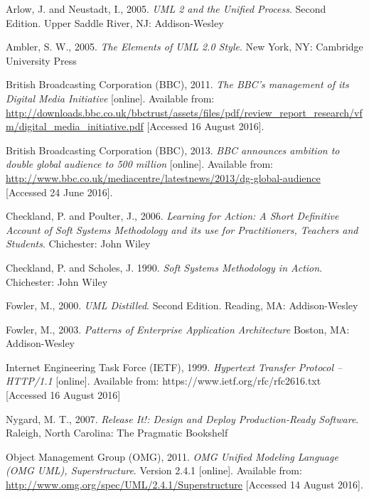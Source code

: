 \documentclass[a4paper]{article}
\begin{document}
\clearpage

\begin{thebibliography}{9}

Arlow, J. and Neustadt, I., 2005.
\textit{UML 2 and the Unified Process}. Second Edition.
Upper Saddle River, NJ: Addison-Wesley

Ambler, S. W., 2005.
\textit{The Elements of UML 2.0 Style}.
New York, NY: Cambridge University Press

British Broadcasting Corporation (BBC), 2011.
\textit{The BBC's management of its Digital Media Initiative} [online].
Available from: \url{http://downloads.bbc.co.uk/bbctrust/assets/files/pdf/review_report_research/vfm/digital_media_initiative.pdf} [Accessed 16 August 2016].

British Broadcasting Corporation (BBC), 2013.
\textit{BBC announces ambition to double global audience to 500 million} [online].
Available from: \url{http://www.bbc.co.uk/mediacentre/latestnews/2013/dg-global-audience} [Accessed 24 June 2016].

Checkland, P. and Poulter, J., 2006.
\textit{Learning for Action: A Short Definitive Account of Soft Systems Methodology and its use for Practitioners, Teachers and Students}.
Chichester: John Wiley

Checkland, P. and Scholes, J. 1990.
\textit{Soft Systems Methodology in Action}.
Chichester: John Wiley

Fowler, M., 2000.
\textit{UML Distilled}. Second Edition.
Reading, MA: Addison-Wesley

Fowler, M., 2003.
\textit{Patterns of Enterprise Application Architecture}
Boston, MA: Addison-Wesley

Internet Engineering Task Force (IETF), 1999.
\textit{Hypertext Transfer Protocol -- HTTP/1.1} [online].
Available from: https://www.ietf.org/rfc/rfc2616.txt
[Accessed 16 August 2016]

Nygard, M. T., 2007.
\textit{Release It!: Design and Deploy Production-Ready Software}.
Raleigh, North Carolina: The Pragmatic Bookshelf

Object Management Group (OMG), 2011.
\textit{OMG Unified Modeling Language (OMG UML), Superstructure}. Version 2.4.1 [online].
Available from: \url{http://www.omg.org/spec/UML/2.4.1/Superstructure} [Accessed 14 August 2016].


\end{thebibliography}
\end{document}
